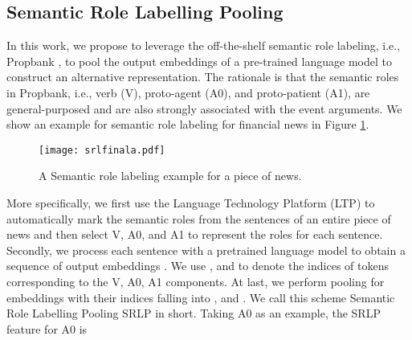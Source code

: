 \documentclass{article}
\begin{document}
\begin{figure*}[t]
\begin{center}
\end{center}
\caption{\label{zero} Overall framework of our approach, including a domain adapted pre-trained model (RoBERTa WWM Ext), Semantic Roles Pooling, transformer layer, self-supervised module (left part), and the supervised module (right part). The green arrow represents a duplicate for the SRLP. The final result is generated from the stock movement classifier, and the total loss is obtained from the self-supervised SRLP part and supervised stock movement classification part.}
\label{yyds}
\end{figure*}



\subsection{Semantic Role Labelling Pooling}
In this work, we propose to leverage the off-the-shelf semantic role labeling, i.e., Propbank \cite{kingsbury2003propbank}, to pool the output embeddings of a pre-trained language model to construct an alternative representation. The rationale is that the semantic roles in Propbank, i.e., verb (V), proto-agent (A0), and proto-patient (A1), are general-purposed and are also strongly associated with the event arguments. We show an example for semantic role labeling for financial news in Figure \ref{srlexample}.

\begin{figure}[H]
\begin{center}  
   \texttt{[image: srlfinala.pdf]}
\end{center}
\caption{A Semantic role labeling example for a piece of news.}
\label{srlexample}
\end{figure}

More specifically, we first use the Language Technology Platform (LTP) \cite{LTP} to automatically mark the semantic roles from the sentences of an entire piece of news and then select V, A0, and A1 to represent the roles for each sentence. Secondly, we process each sentence with a pretrained language model to obtain a sequence of output embeddings
. We use ,  and  to denote the indices of tokens corresponding to the V, A0, A1 components. At last, we perform pooling for embeddings with their indices falling into ,  and . We call this scheme Semantic Role Labelling Pooling SRLP in short. Taking A0 as an example, the SRLP feature for A0 is 
\end{document}
